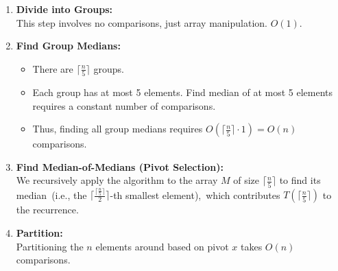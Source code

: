 \documentclass[11pt, a4paper, oneside]{memoir}
\begin{document}
\begin{enumerate}
    \item \textbf{Divide into Groups:} \\
          This step involves no comparisons, just array manipulation. $O(1)$.

    \item \textbf{Find Group Medians:}
          \begin{itemize}
              \item There are $\lceil \frac{n}{5} \rceil$ groups.
              \item Each group has at most 5 elements. Find median of at most 5 elements requires a constant number of comparisons\footnotemark.
              \item Thus, finding all group medians requires $O(\lceil \frac{n}{5} \rceil \cdot 1) = O(n)$ comparisons.
          \end{itemize}


    \item \textbf{Find Median-of-Medians (Pivot Selection):} \\
          We recursively apply the algorithm to the array $M$ of size $\lceil \frac{n}{5} \rceil$ to find its median\
          (i.e., the $\lceil \frac{\lceil \frac{n}{5} \rceil}{2} \rceil$-th smallest element),\
          which contributes $T(\lceil \frac{n}{5} \rceil)$ to the recurrence.

    \item \textbf{Partition:} \\
          Partitioning the $n$ elements around based on pivot $x$ takes $O(n)$ comparisons.


\end{enumerate}
\end{document}
